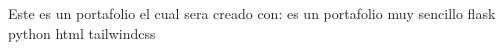 Este es un portafolio el cual sera creado con:
es un portafolio muy sencillo
 flask
  python
  html
  tailwindcss












